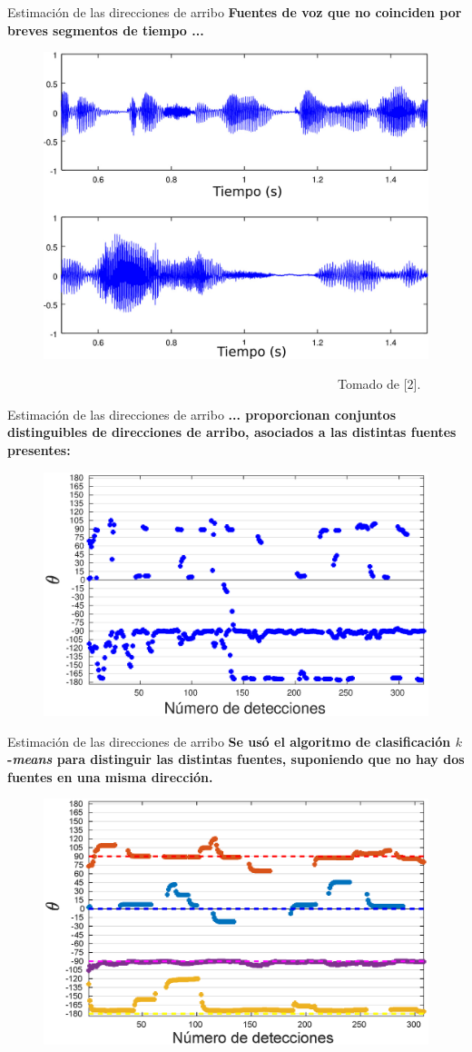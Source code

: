 \documentclass[12pt,aspectratio=169]{beamer}
\begin{document}
	\begin{frame}{Estimación de las direcciones de arribo}
	\textbf{Fuentes de voz que no coinciden por breves segmentos de tiempo ...}
	\begin{figure}[h]
		\centering
		\includegraphics[width=0.5\linewidth]{figures/nonoverlap}
	\end{figure}
	\vspace{-2mm}
	~~~~~~~~~~~~~~~~~~~~~~~~~~~~~~~~~~~~~~~~~~~~~~~~~~~~\tiny{Tomado de [2].}
	\end{frame}
	
	\begin{frame}{Estimación de las direcciones de arribo}
		\textbf{... proporcionan conjuntos distinguibles de direcciones de arribo, asociados a las distintas fuentes presentes:}
		
		\begin{figure}[h]
			\centering
			\includegraphics[width=0.65\linewidth]{figures/plot4uncolor}
		\end{figure}
	\end{frame}
	\begin{frame}{Estimación de las direcciones de arribo}
		\textbf{Se usó el algoritmo de clasificación $k$-\textit{means} para distinguir las distintas fuentes, suponiendo que no hay dos fuentes en una misma dirección.}
		
		\begin{figure}[h]
			\centering
			\includegraphics[width=0.65\linewidth]{figures/plot4colornomean}
		\end{figure}
	\end{frame}
	
\end{document}
